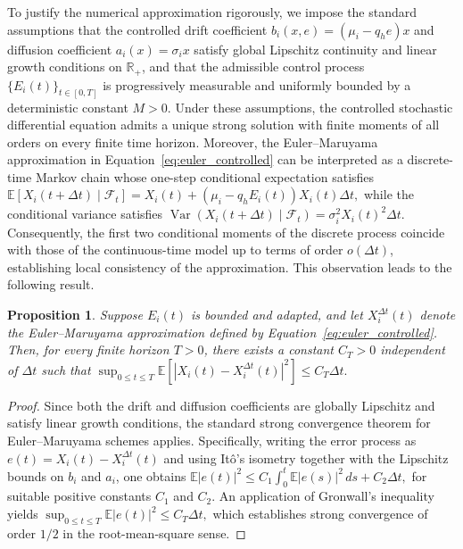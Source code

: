 \documentclass[11pt]{article}
\newtheorem{prop}[theorem]{\bf Proposition}
\begin{document}
	To justify the numerical approximation rigorously, we impose the standard assumptions that the controlled drift coefficient $b_i(x,e)=(\mu_i-q_h e)x$ and diffusion coefficient $a_i(x)=\sigma_i x$ satisfy global Lipschitz continuity and linear growth conditions on $\mathbb{R}_+$, and that the admissible control process $\{E_i(t)\}_{t\in[0,T]}$ is progressively measurable and uniformly bounded by a deterministic constant $M>0$. Under these assumptions, the controlled stochastic differential equation admits a unique strong solution with finite moments of all orders on every finite time horizon. Moreover, the Euler--Maruyama approximation in Equation~\eqref{eq:euler_controlled} can be interpreted as a discrete-time Markov chain whose one-step conditional expectation satisfies
	$
	\mathbb{E}[X_i(t+\Delta t)\mid\mathcal{F}_t]
	=
	X_i(t)+(\mu_i-q_hE_i(t))X_i(t)\Delta t,
	$
	while the conditional variance satisfies
	$
	\operatorname{Var}(X_i(t+\Delta t)\mid\mathcal{F}_t)
	=
	\sigma_i^2X_i(t)^2\Delta t.
	$
	Consequently, the first two conditional moments of the discrete process coincide with those of the continuous-time model up to terms of order $o(\Delta t)$, establishing local consistency of the approximation. This observation leads to the following result.
	
	\begin{prop}
		Suppose $E_i(t)$ is bounded and adapted, and let $X_i^{\Delta t}(t)$ denote the Euler--Maruyama approximation defined by Equation~\eqref{eq:euler_controlled}. Then, for every finite horizon $T>0$, there exists a constant $C_T>0$ independent of $\Delta t$ such that
		$
		\sup_{0\leq t\leq T}
		\mathbb{E}
		\left[
		|X_i(t)-X_i^{\Delta t}(t)|^2
		\right]
		\leq
		C_T\Delta t.
		$
	\end{prop}
	
	\begin{proof}
		Since both the drift and diffusion coefficients are globally Lipschitz and satisfy linear growth conditions, the standard strong convergence theorem for Euler--Maruyama schemes applies. Specifically, writing the error process as $e(t)=X_i(t)-X_i^{\Delta t}(t)$ and using It\^o's isometry together with the Lipschitz bounds on $b_i$ and $a_i$, one obtains
		$
		\mathbb{E}|e(t)|^2
		\leq
		C_1
		\int_0^t
		\mathbb{E}|e(s)|^2\,ds
		+
		C_2\Delta t,
		$
		for suitable positive constants $C_1$ and $C_2$. An application of Gronwall's inequality yields
		$
		\sup_{0\leq t\leq T}
		\mathbb{E}|e(t)|^2
		\leq
		C_T\Delta t,
		$
		which establishes strong convergence of order $1/2$ in the root-mean-square sense. \end{proof}
	
\end{document}
